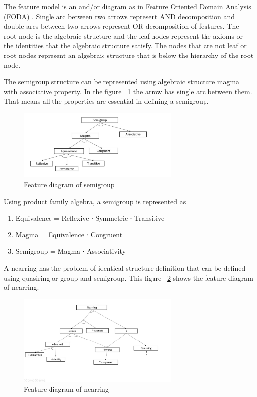 The feature model is an and/or diagram as in Feature Oriented Domain Analysis
(FODA) \cite{kang1990feature}. Single arc between two arrows represent AND
decomposition and double arcs between two arrows represent OR decomposition of
features. The root node is the algebraic structure and the leaf nodes represent
the axioms or the identities that the algebraic structure satisfy. The nodes
that are not leaf or root nodes represent an algebraic structure that is below
the hierarchy of the root node. 

The semigroup structure can be represented using algebraic structure magma with
associative property. In the figure ~\ref{fig_multienv_1} the arrow has single
arc between them. That means all the properties are essential in defining a
semigroup.
\begin{figure}[ht]
	\centering
	\includegraphics[width=0.7\textwidth]{figures/Sample/semigroupPFA.jpg}
	\caption{Feature diagram of semigroup}
	\label{fig_multienv_1}
\end{figure}

Using product family algebra, a semigroup is represented as 
\begin{enumerate}
\item Equivalence = Reflexive ∙ Symmetric ∙ Transitive
\item Magma = Equivalence ∙ Congruent
\item Semigroup = Magma ∙ Associativity 
\end{enumerate}
A nearring has the problem of identical structure definition that can be defined
using quasiring or group and semigroup. This figure ~\ref{fig_nearring} shows
the feature diagram of nearring. 
 \begin{figure}[ht]
	\centering		
	\includegraphics[width=0.7\textwidth]{figures/Sample/nearringPFA.jpg}
	\caption{Feature diagram of nearring}
	\label{fig_nearring}
\end{figure}

